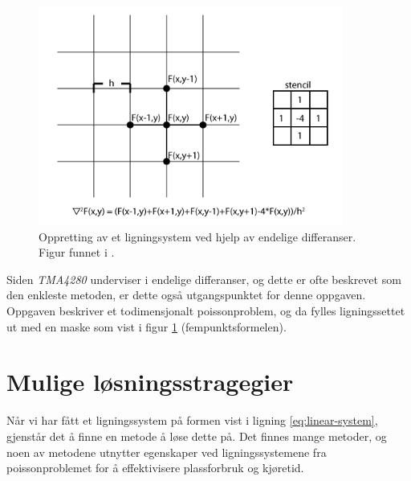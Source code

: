 \documentclass{article}
\begin{document}
\begin{figure}[t]
	\label{fig:finite-difference}
	\centering
	\includegraphics[width=10cm]{img/finite-difference.png}	
	\caption{Oppretting av et ligningsystem ved hjelp av endelige differanser. Figur funnet i \cite{rdw}. }
	
\end{figure}

Siden \emph{TMA4280} underviser i endelige differanser, og dette er ofte beskrevet som den enkleste metoden, er dette også utgangspunktet for denne oppgaven. Oppgaven beskriver et todimensjonalt poissonproblem, og da fylles ligningssettet ut med en maske som vist i figur \ref{fig:finite-difference} (fempunktsformelen).

\section{Mulige løsningsstragegier}
Når vi har fått et ligningssystem på formen vist i ligning \ref{eq:linear-system}, gjenstår det å finne en metode å løse dette på. Det finnes mange metoder, og noen av metodene utnytter egenskaper ved ligningssystemene fra poissonproblemet for å effektivisere plassforbruk og kjøretid.
\end{document}
